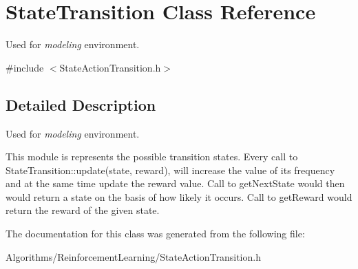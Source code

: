 \hypertarget{classStateTransition}{\section{State\-Transition Class Reference}
\label{classStateTransition}
}


Used for {\itshape modeling} environment.  




{\ttfamily \#include $<$State\-Action\-Transition.\-h$>$}



\subsection{Detailed Description}
Used for {\itshape modeling} environment. 

This module is represents the possible transition states. Every call to State\-Transition\-::update(state, reward), will increase the value of its frequency and at the same time update the reward value. Call to get\-Next\-State would then would return a state on the basis of how likely it occurs. Call to get\-Reward would return the reward of the given state. 

The documentation for this class was generated from the following file\-:\begin{DoxyCompactItemize}
\item 
Algorithms/\-Reinforcement\-Learning/State\-Action\-Transition.\-h\end{DoxyCompactItemize}
